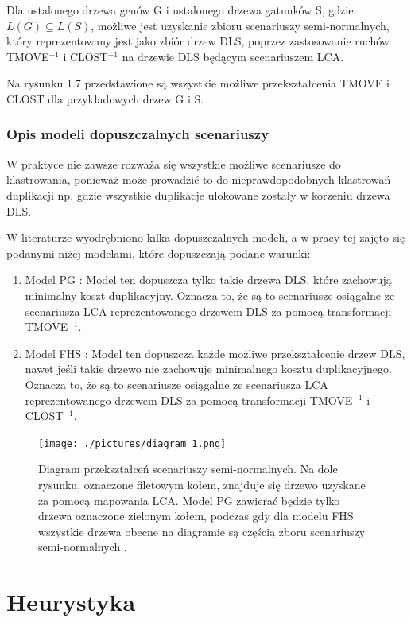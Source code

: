 \documentclass[licencjacka]{pracamgr}
\begin{document}
Dla ustalonego drzewa genów G i ustalonego drzewa gatunków S, gdzie $L(G) \subseteq L(S)$, możliwe jest uzyskanie zbioru scenariuszy semi-normalnych, który reprezentowany jest jako zbiór drzew DLS, poprzez zastosowanie ruchów TMOVE$^{-1}$ i CLOST$^{-1}$ na drzewie DLS będącym scenariuszem LCA. 

Na rysunku 1.7 przedstawione są wszystkie możliwe przekształcenia TMOVE i CLOST dla przykładowych drzew G i S.

\subsection{Opis modeli dopuszczalnych scenariuszy}

W praktyce nie zawsze rozważa się wszystkie możliwe scenariusze do klastrowania, ponieważ może prowadzić to do nieprawdopodobnych klastrowań duplikacji np. gdzie wszystkie duplikacje ulokowane zostały w korzeniu drzewa DLS. 

W literaturze wyodrębniono kilka dopuszczalnych modeli, a w pracy tej zajęto się podanymi niżej modelami, które dopuszczają podane warunki:
\begin{enumerate}
\item Model PG \cite{pasz}: Model ten dopuszcza tylko takie drzewa DLS, które zachowują minimalny koszt duplikacyjny. Oznacza to, że są to scenariusze osiągalne ze scenariusza LCA reprezentowanego drzewem DLS za pomocą transformacji TMOVE$^{-1}$.
\item Model FHS \cite{pasz}: Model ten dopuszcza każde możliwe przekształcenie drzew DLS, nawet jeśli takie drzewo nie zachowuje minimalnego kosztu duplikacyjnego. Oznacza to, że są to scenariusze osiągalne ze scenariusza LCA reprezentowanego drzewem DLS za pomocą transformacji TMOVE$^{-1}$ i CLOST$^{-1}$.
\end{enumerate}

\begin{figure}[H]\label{diagram_red}
  \centering
  \texttt{[image: ./pictures/diagram\_1.png]}
  \caption{Diagram przekształceń scenariuszy semi-normalnych. Na dole rysunku, oznaczone filetowym kołem, znajduje się drzewo uzyskane za pomocą mapowania LCA. Model PG zawierać będzie tylko drzewa oznaczone zielonym kołem, podczas gdy dla modelu FHS wszystkie drzewa obecne na diagramie są częścią zboru scenariuszy semi-normalnych \cite{gsevol}.}
\end{figure}

\chapter{Heurystyka}\label{r:heurystyka}
\end{document}

